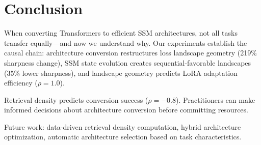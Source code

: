 \section{Conclusion}

When converting Transformers to efficient SSM architectures, not all tasks transfer equally---and now we understand why. Our experiments establish the causal chain: architecture conversion restructures loss landscape geometry (219\% sharpness change), SSM state evolution creates sequential-favorable landscapes (35\% lower sharpness), and landscape geometry predicts LoRA adaptation efficiency ($\rho=1.0$).

Retrieval density predicts conversion success ($\rho=-0.8$). Practitioners can make informed decisions about architecture conversion before committing resources.

Future work: data-driven retrieval density computation, hybrid architecture optimization, automatic architecture selection based on task characteristics.
